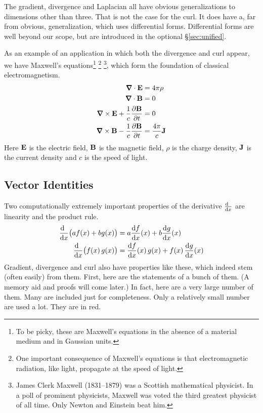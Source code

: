 \noindent The gradient, divergence and Laplacian all have obvious 
generalizations to dimensions other than three. That is not the case for
the curl. It does have a, far from obvious, generalization, which
uses differential forms. Differential forms are well beyond our scope,
but are introduced in the optional \S\ref{sec:unified}.

\begin{eg}\label{eg:ITmaxwell}
As an example of an application in which both the divergence and curl appear,
we have Maxwell's equations\footnote{To be picky, these are Maxwell's
equations in the absence of a material medium and in Gaussian units.}
\footnote{One important consequence of Maxwell's equations is that 
electromagnetic radiation, like light, propagate at the speed of light.}
\footnote{James Clerk Maxwell (1831--1879) was a Scottish mathematical 
physicist. In a poll of prominent physicists, Maxwell was voted the third greatest physicist of all time. Only Newton and Einstein beat him.}, 
which form the foundation of classical electromagnetism.
\begin{align*}
\vnabla\cdot\vE &= 4\pi\rho \\
\vnabla\cdot\vB &= 0 \\
\vnabla\times\vE +\frac{1}{c}\frac{\partial\vB}{\partial t}&=0 \\
\vnabla\times\vB -\frac{1}{c}\frac{\partial\vB}{\partial t}&=\frac{4\pi}{c}\vJ 
\end{align*}
Here $\mathbf{E}$ is the electric field, $\mathbf{B}$ is the magnetic field, $\rho$ is the charge density, $\mathbf{J}$ is the current density and $c$ is the speed of light.
\end{eg}

\subsection{Vector Identities} \label{sec:vectorId}
Two computationally extremely important properties of the derivative
$\diff{\ }{x}$ are linearity and the product rule.
\begin{align*}
\diff{\ }{x}\big(af(x)+bg(x)\big) &=a\diff{f}{x}(x)+b\diff{g}{x}(x) \\
\diff{\ }{x}\big(f(x)\,g(x)\big) &=\diff{f}{x}(x)\,g(x)+f(x)\,\diff{g}{x}(x)
\end{align*}
Gradient, divergence and curl also have properties like these, which 
indeed stem (often easily) from them. First, here are the statements of a bunch of them. (A memory aid and proofs will come later.)  In fact, here are a very large 
number of them. Many are included just for completeness. Only a relatively small number are used a lot. They are in red. 

